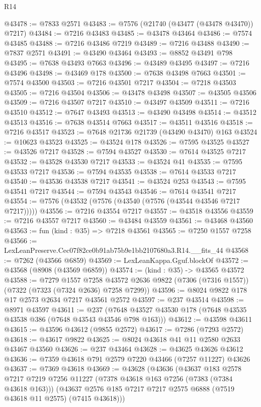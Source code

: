 \begin{lexlean}{R14}
\begin{coremodule}
@43478 := @7833 @2571
@43483 := @7576 (@21740 (@43477 (@43478 @43470)) @7217)
@43484 := @7216 @43483
@43485 := @43478 @43464
@43486 := @7574 @43485
@43488 := @7216 @43486 @7219
@43489 := @7216 @43488
@43490 := @7837 @2571
@43491 := @43490 @43464
@43493 := @8852 @43491 @798
@43495 := @7638 @43493 @7663
@43496 := @43489 @43495
@43497 := @7216 @43496
@43498 := @43469 @178
@43500 := @7638 @43498 @7663
@43501 := @7574 @43500
@43503 := @7216 @43501 @7217
@43504 := @7218 @43503
@43505 := @7216 @43504
@43506 := @43478 @43498
@43507 := @43505 @43506
@43509 := @7216 @43507 @7217
@43510 := @43497 @43509
@43511 := @7216 @43510
@43512 := @7647 @43493
@43513 := @43490 @43498
@43514 := @43512 @43513
@43516 := @7638 @43514 @7663
@43517 := @43511 @43516
@43518 := @7216 @43517
@43523 := @7648 @21736 @21739 (@43490 @43470) @163
@43524 := @10623 @43523
@43525 := @43524 @178
@43526 := @7595 @43525
@43527 := @43526 @7217
@43528 := @7594 @43527
@43530 := @7614 @43525 @7217
@43532 := @43528 @43530 @7217
@43533 := @43524 @41
@43535 := @7595 @43533 @7217
@43536 := @7594 @43535
@43538 := @7614 @43533 @7217
@43540 := @43536 @43538 @7217
@43541 := @43524 @253
@43543 := @7595 @43541 @7217
@43544 := @7594 @43543
@43546 := @7614 @43541 @7217
@43554 := @7576 (@43532 (@7576 (@43540 (@7576 (@43544 @43546 @7217 @7217)))))
@43556 := @7216 @43554 @7217
@43557 := @43518 @43556
@43559 := @7216 @43557 @7217
@43560 := @43484 @43559
@43561 := @43468 @43560
@43563 := fun (kind : @35) => @7218 @43561
@43565 := @7250 @1557 @7258
@43566 := LexLeanPreserve.Cec07f82ce0b91ab75b9e1bb2107680a3.R14.__fits_44
@43568 := @7262 (@43566 @6859)
@43569 := LexLeanKappa.Gguf.blockOf
@43572 := @43568 (@8908 (@43569 @6859))
@43574 := (kind : @35) -> @43565 @43572
@43588 := @7279
    @1557
    @7258
    @43572
    @2636
    @9822
    (@7306 (@7316 @1557))
    (@7322 (@7323 (@7324 @2636) @7258 @7299))
@43596 := @8024 @9822 @178 @17 @2573 @2634 @7217 @43561 @2572
@43597 := @237 @43514
@43598 := @8971 @43597
@43611 := @237 (@7648 @43527 @43530 @178 (@7648 @43535 @43538 @386 (@7648 @43543 @43546 @798 @163)))
@43612 := @43598 @43611
@43615 := @43596 @43612 (@9855 @2572)
@43617 := @7286 (@7293 @2572)
@43618 := @43617 @9822
@43625 := @8024 @43618 @41 @11 @2580 @2633 @43467 @43560
@43626 := @237 @43464
@43628 := @43625 @43626 @43612
@43636 := @7359 @43618 @791 @2579 @7220 @43466 (@7257 @11227) @43626
@43637 := @7369 @43618
@43669 := @43628
    (@43636
      (@43637
        @183
        @2578
        @7217
        @7219
        @7256
        @11227
        (@7378 @43618 @163 @7256 (@7383 (@7384 @43618 @163)))
        (@43637 @2576 @185 @7217 @7217 @2575 @6888 (@7519 @43618 @11 @2575) (@7415 @43618)))

\end{coremodule}
\end{lexlean}
